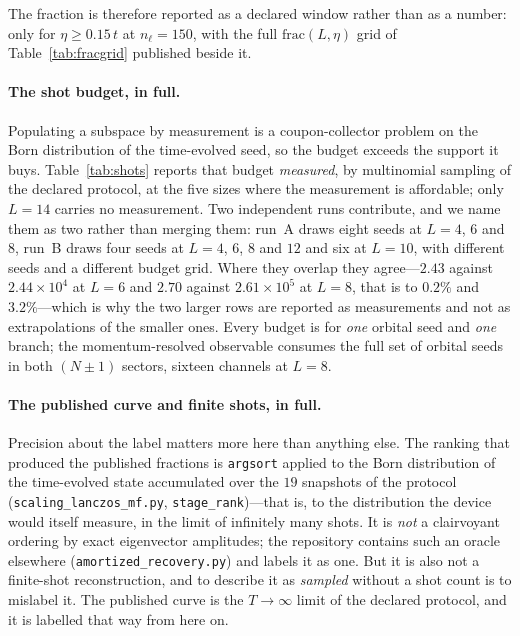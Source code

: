 The fraction is therefore reported as a declared window rather than as a number: only for
$\eta\ge0.15\,t$ at $n_\ell=150$, with the full $\mathrm{frac}(L,\eta)$ grid of
Table~\ref{tab:fracgrid} published beside it.

\paragraph{The shot budget, in full.} Populating a subspace by measurement is a coupon-collector problem on the Born distribution of the
time-evolved seed, so the budget exceeds the support it buys. Table~\ref{tab:shots} reports that budget
\emph{measured}, by multinomial sampling of the declared protocol, at the five sizes where the
measurement is affordable; only $L=14$ carries no measurement. Two independent runs contribute, and we
name them as two rather than merging them: run~A draws eight seeds at $L=4$, $6$ and $8$, run~B draws
four seeds at $L=4$, $6$, $8$ and $12$ and six at $L=10$, with different seeds and a different budget
grid. Where they overlap they agree---$2.43$ against $2.44\times10^{4}$ at $L=6$ and $2.70$ against
$2.61\times10^{5}$ at $L=8$, that is to $0.2\%$ and $3.2\%$---which is why the two larger rows are
reported as measurements and not as extrapolations of the smaller ones. Every budget is for \emph{one}
orbital seed and \emph{one} branch; the momentum-resolved observable consumes the full set of orbital
seeds in both $(N{\pm}1)$ sectors, sixteen channels at $L=8$.

\paragraph{The published curve and finite shots, in full.} Precision about the label matters more here than anything else. The ranking that produced the
published fractions is \texttt{argsort} applied to the Born distribution of the time-evolved state
accumulated over the $19$ snapshots of the protocol (\texttt{scaling\_lanczos\_mf.py},
\texttt{stage\_rank})---that is, to the distribution the device would itself measure, in the limit of
infinitely many shots. It is \emph{not} a clairvoyant ordering by exact eigenvector amplitudes; the
repository contains such an oracle elsewhere (\texttt{amortized\_recovery.py}) and labels it as one.
But it is also not a finite-shot reconstruction, and to describe it as \emph{sampled} without a shot
count is to mislabel it. The published curve is the $T\to\infty$ limit of the declared protocol, and it is
labelled that way from here on.

